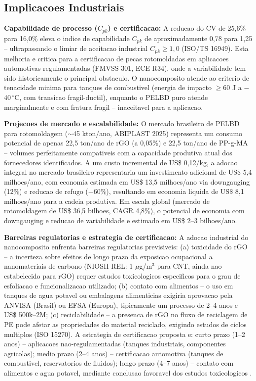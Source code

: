 \documentclass[11pt,a4paper,oneside]{article}
\begin{document}
\subsection{Implicacoes Industriais}\label{sec:implic_indus}

{\bfseries Capabilidade de processo ($C_{pk}$) e certificacao:} A reducao do CV de 25,6\% para 16,0\% eleva o indice de capabilidade $C_{pk}$ de aproximadamente 0,78 para 1,25 -- ultrapassando o limiar de aceitacao industrial $C_{pk}{\ge}1{,}0$ (ISO/TS 16949). Esta melhoria e critica para a certificacao de pecas rotomoldadas em aplicacoes automotivas regulamentadas (FMVSS 301, ECE R34), onde a variabilidade tem sido historicamente o principal obstaculo. O nanocomposito atende ao criterio de tenacidade minima para tanques de combustivel (energia de impacto $\ge60$ J a $-$40$\,^{\circ}$C, com transicao fragil-ductil), enquanto o PELBD puro atende marginalmente e com fratura fragil -- inaceitavel para a aplicacao.

{\bfseries Projecoes de mercado e escalabilidade:} O mercado brasileiro de PELBD para rotomoldagem (${\sim}$45 kton/ano, ABIPLAST 2025) representa um consumo potencial de apenas 22,5 ton/ano de rGO (a 0,05\%) e 22,5 ton/ano de PP-g-MA -- volumes perfeitamente compativeis com a capacidade produtiva atual dos fornecedores identificados. A um custo incremental de US\$ 0,12/kg, a adocao integral no mercado brasileiro representaria um investimento adicional de US\$ 5,4 milhoes/ano, com economia estimada em US\$ 13,5 milhoes/ano via downgauging (12\%) e reducao de refugo ($-$60\%), resultando em economia liquida de US\$ 8,1 milhoes/ano para a cadeia produtiva. Em escala global (mercado de rotomoldagem de US\$ 36,5 bilhoes, CAGR 4,8\%), o potencial de economia com downgauging e reducao de variabilidade e estimado em US\$ 2--3 bilhoes/ano.

{\bfseries Barreiras regulatorias e estrategia de certificacao:} A adocao industrial do nanocomposito enfrenta barreiras regulatorias previsiveis: (a) toxicidade do rGO -- a incerteza sobre efeitos de longo prazo da exposicao ocupacional a nanomateriais de carbono (NIOSH REL: 1 $\mu$g/m$^3$ para CNT, ainda nao estabelecido para rGO) requer estudos toxicologicos especificos para o grau de esfoliacao e funcionalizacao utilizado; (b) contato com alimentos -- o uso em tanques de agua potavel ou embalagens alimenticias exigiria aprovacao pela ANVISA (Brasil) ou EFSA (Europa), tipicamente um processo de 2--4 anos e US\$ 500k--2M; (c) reciclabilidade -- a presenca de rGO no fluxo de reciclagem de PE pode afetar as propriedades do material reciclado, exigindo estudos de ciclos multiplos (ISO 15270). A estrategia de certificacao proposta e: curto prazo (1--2 anos) -- aplicacoes nao-regulamentadas (tanques industriais, componentes agricolas); medio prazo (2--4 anos) -- certificacao automotiva (tanques de combustivel, reservatorios de fluidos); longo prazo (4--7 anos) -- contato com alimentos e agua potavel, mediante conclusao favoravel dos estudos toxicologicos \cite{Montgomery2020}.
\end{document}
